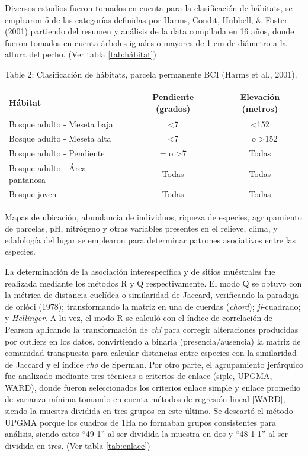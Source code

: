 \documentclass[11pt,]{article}
\begin{document}
Diversos estudios fueron tomados en cuenta para la clasificación de
hábitats, se emplearon 5 de las categorías definidas por Harms, Condit,
Hubbell, \& Foster (2001) partiendo del resumen y análisis de la data
compilada en 16 años, donde fueron tomados en cuenta árboles iguales o
mayores de 1 cm de diámetro a la altura del pecho. (Ver tabla
\ref{tab:hábitat})

Table 2: Clasificación de hábitats, parcela permanente BCI (Harms et
al., 2001).\label{tab:hábitat}

\begin{longtable}[]{@{}lcc@{}}
\toprule
Hábitat & Pendiente (grados) & Elevación (metros)\tabularnewline
\midrule
\endhead
Bosque adulto - Meseta baja & \textless{}7 &
\textless{}152\tabularnewline
Bosque adulto - Meseta alta & \textless{}7 & = o
\textgreater{}152\tabularnewline
Bosque adulto - Pendiente & = o \textgreater{}7 & Todas\tabularnewline
Bosque adulto - Área pantanosa & Todas & Todas\tabularnewline
Bosque joven & Todas & Todas\tabularnewline
\bottomrule
\end{longtable}

Mapas de ubicación, abundancia de individuos, riqueza de especies,
agrupamiento de parcelas, pH, nitrógeno y otras variables presentes en
el relieve, clima, y edafología del lugar se emplearon para determinar
patrones asociativos entre las especies.

La determinación de la asociación interespecífica y de sitios muéstrales
fue realizada mediante los métodos R y Q respectivamente. El modo Q se
obtuvo con la métrica de distancia euclídea o similaridad de Jaccard,
verificando la paradoja de orlóci (1978); transformando la matriz en una
de cuerdas (\emph{chord}); \emph{ji}-cuadrado; y \emph{Hellinger}. A lu
vez, el modo R se calculó con el índice de correlación de Pearson
aplicando la transformación de \emph{chi} para corregir alteraciones
producidas por outliers en los datos, convirtiendo a binaria
(presencia/ausencia) la matriz de comunidad transpuesta para calcular
distancias entre especies con la similaridad de Jaccard y el índice
\emph{rho} de Sperman. Por otro parte, el agrupamiento jerárquico fue
analizado mediante tres técnicas o criterios de enlace (siple, UPGMA,
WARD), donde fueron seleccionados los criterios enlace simple y enlace
promedio de varianza mínima tomando en cuenta métodos de regresión
lineal {[}WARD{]}, siendo la muestra dividida en tres grupos en este
último. Se descartó el método UPGMA porque los cuadros de 1Ha no
formaban grupos consistentes para análisis, siendo estos ``49-1'' al ser
dividida la muestra en dos y ``48-1-1'' al ser dividida en tres. (Ver
tabla \ref{tab:enlace})
\end{document}
